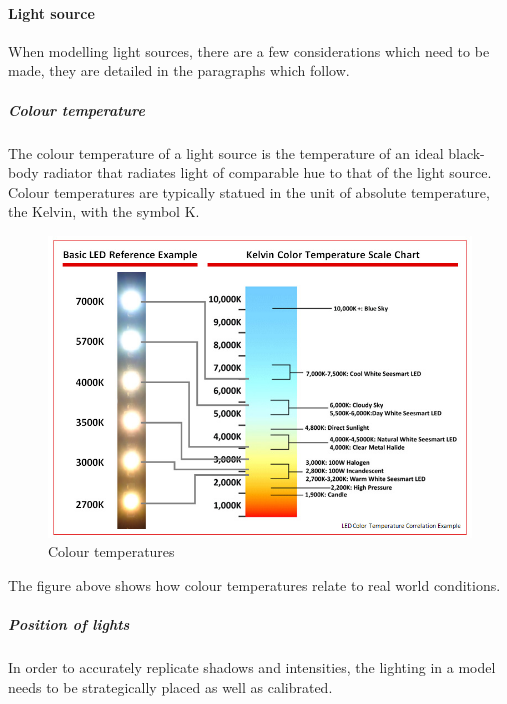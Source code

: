 \documentclass[11pt,a4paper]{report}
\begin{document}
				\paragraph{Light source}
					When modelling light sources, there are a few considerations which need to be made, they are detailed in the paragraphs which follow.
					\subparagraph{Colour temperature}
						The colour temperature of a light source is the temperature of an ideal black-body radiator that radiates light of comparable hue to that of the light source. Colour temperatures are typically statued in the unit of absolute temperature, the Kelvin, with the symbol K.
						\begin{figure}[H]
							\centering
							\includegraphics[width=1\textwidth]{colour_temperature}
							\caption{Colour temperatures}
						\end{figure}
						The figure above shows how colour temperatures relate to real world conditions.
				
					\subparagraph{Position of lights}
						In order to accurately replicate shadows and intensities, the lighting in a model needs to be strategically placed as well as calibrated.
						
\end{document}
